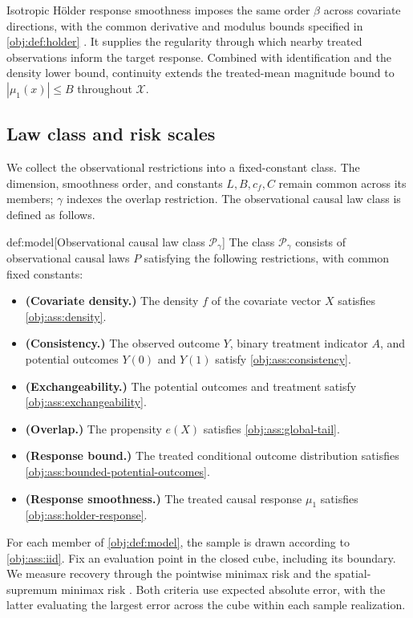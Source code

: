 \documentclass[11pt]{article}
\begin{document}
Isotropic Hölder response smoothness imposes the same order \(\beta\) across covariate directions, with the common derivative and modulus bounds specified in \cref{obj:def:holder} \citep{Dorn2026GlobalOverlap}. It supplies the regularity through which nearby treated observations inform the target response. Combined with identification and the density lower bound, continuity extends the treated-mean magnitude bound to \(|\mu_1(x)|\le B\) throughout \(\mathcal X\).

\subsection{Law class and risk scales}

We collect the observational restrictions into a fixed-constant class. The dimension, smoothness order, and constants \(L,B,c_f,C\) remain common across its members; \(\gamma\) indexes the overlap restriction. The observational causal law class  is defined as follows.

\begin{definitionv}{def:model}[Observational causal law class $\mathcal P_\gamma$]
The class \(\mathcal P_\gamma\) consists of observational causal laws \(P\) satisfying the following restrictions, with common fixed constants:
\begin{itemize}
\item \textbf{(Covariate density.)} The density \(f\) of the covariate vector \(X\) satisfies \cref{obj:ass:density}.
\item \textbf{(Consistency.)} The observed outcome \(Y\), binary treatment indicator \(A\), and potential outcomes \(Y(0)\) and \(Y(1)\) satisfy \cref{obj:ass:consistency}.
\item \textbf{(Exchangeability.)} The potential outcomes and treatment satisfy \cref{obj:ass:exchangeability}.
\item \textbf{(Overlap.)} The propensity \(e(X)\) satisfies \cref{obj:ass:global-tail}.
\item \textbf{(Response bound.)} The treated conditional outcome distribution satisfies \cref{obj:ass:bounded-potential-outcomes}.
\item \textbf{(Response smoothness.)} The treated causal response \(\mu_1\) satisfies \cref{obj:ass:holder-response}.
\end{itemize}
\end{definitionv}

For each member of \cref{obj:def:model}, the sample is drawn according to \cref{obj:ass:iid}. Fix an evaluation point  in the closed cube, including its boundary. We measure recovery through the pointwise minimax risk  and the spatial-supremum minimax risk . Both criteria use expected absolute error, with the latter evaluating the largest error across the cube within each sample realization.
\end{document}
